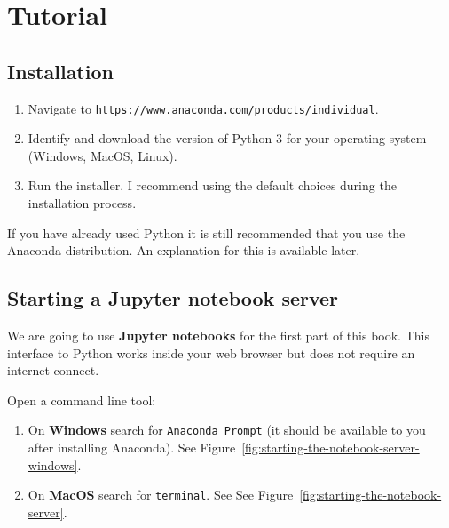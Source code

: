 \section{Tutorial}

\subsection{Installation}
\begin{enumerate}
\item Navigate to \texttt{https://www.anaconda.com/products/individual}.

\item Identify and download the version of Python 3 for your operating system
(Windows, MacOS, Linux).

\item Run the installer. I recommend using the default choices during the
installation process.

\end{enumerate}

If you have already used Python it is still recommended that you use the
Anaconda distribution. An explanation for this is available later.


\subsection{Starting a Jupyter notebook server}
We are going to use \textbf{Jupyter notebooks} for the first part of this book.
This interface to Python works inside your web browser but does not require an
internet connect.

Open a command line tool:
\begin{enumerate}
\item 
On \textbf{Windows} search for \texttt{Anaconda Prompt} (it should be available to you
after installing Anaconda). See Figure~\ref{fig:starting-the-notebook-server-windows}.

\item On \textbf{MacOS} search for \texttt{terminal}. See
See Figure~\ref{fig:starting-the-notebook-server}.


\end{enumerate}

